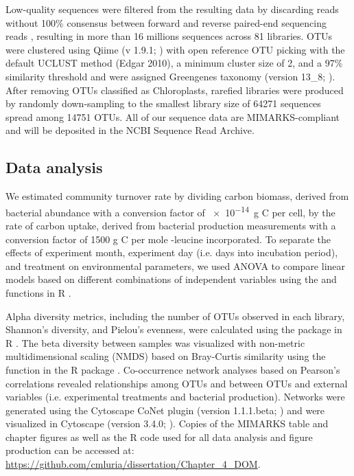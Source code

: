 Low-quality sequences were filtered from the resulting data by discarding reads without 100\% consensus between forward and reverse paired-end sequencing reads \citep{Eren2013-ob}, resulting in more than 16 millions sequences across 81 libraries. OTUs were clustered using Qiime (v 1.9.1; \citealt{Caporaso2010-ee}) with open reference OTU picking with the default UCLUST method (Edgar 2010), a minimum cluster size of 2, and a 97\% similarity threshold and were assigned Greengenes taxonomy (version 13\_8; \citealt{McDonald2012-qf}). After removing OTUs classified as Chloroplasts, rarefied libraries were produced by randomly down-sampling to the smallest library size of 64271 sequences spread among 14751 OTUs. All of our sequence data are MIMARKS-compliant \citep{Yilmaz:2011aa} and will be deposited in the NCBI Sequence Read Archive. 

\subsection{Data analysis}

We estimated community turnover rate by dividing carbon biomass, derived from bacterial abundance with a conversion factor of \SI{e-14}{\gram} C per cell, by the rate of carbon uptake, derived from bacterial production measurements with a conversion factor of 1500 g C per mole -leucine incorporated. To separate the effects of experiment month, experiment day (i.e. days into incubation period), and treatment on environmental parameters, we used ANOVA to compare linear models based on different combinations of independent variables using the  and  functions in R \citep{t08}. 

Alpha diversity metrics, including the number of OTUs observed in each library, Shannon's diversity, and Pielou's evenness, were calculated using the  package in R \citep{kindt2005tree}. The beta diversity between samples was visualized with non-metric multidimensional scaling (NMDS) based on Bray-Curtis similarity using the  function in the  R package \citep{Oksanen_2015}. Co-occurrence network analyses based on Pearson's correlations revealed relationships among OTUs and between OTUs and external variables (i.e. experimental treatments and bacterial production). Networks were generated using the Cytoscape CoNet plugin (version 1.1.1.beta; \citealt{faust2012microbial}) and were visualized in Cytoscape (version 3.4.0; \citealt{smobwr}). Copies of the MIMARKS table and chapter figures as well as the R code used for all data analysis and figure production can be accessed at: \url{https://github.com/cmluria/dissertation/Chapter_4_DOM}. 

